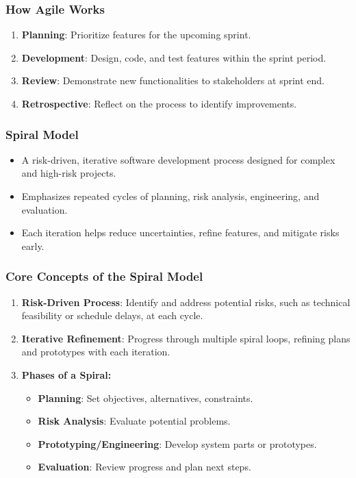 \documentclass{beamer}
\begin{document}
\begin{frame}[fragile]
  \frametitle{How Agile Works}
  \begin{enumerate}
    \item \textbf{Planning}: Prioritize features for the upcoming sprint.
    \item \textbf{Development}: Design, code, and test features within the sprint period.
    \item \textbf{Review}: Demonstrate new functionalities to stakeholders at sprint end.
    \item \textbf{Retrospective}: Reflect on the process to identify improvements.
  \end{enumerate}
\end{frame}

\begin{frame}[fragile]
    \frametitle{Spiral Model}
    \begin{itemize}
        \item A risk-driven, iterative software development process designed for complex and high-risk projects.
        \item Emphasizes repeated cycles of planning, risk analysis, engineering, and evaluation.
        \item Each iteration helps reduce uncertainties, refine features, and mitigate risks early.
    \end{itemize}
\end{frame}

\begin{frame}[fragile]
    \frametitle{Core Concepts of the Spiral Model}
    \begin{enumerate}
        \item \textbf{Risk-Driven Process}: Identify and address potential risks, such as technical feasibility or schedule delays, at each cycle.
        \item \textbf{Iterative Refinement}: Progress through multiple spiral loops, refining plans and prototypes with each iteration.
        \item \textbf{Phases of a Spiral:}
        \begin{itemize}
            \item \textbf{Planning}: Set objectives, alternatives, constraints.
            \item \textbf{Risk Analysis}: Evaluate potential problems.
            \item \textbf{Prototyping/Engineering}: Develop system parts or prototypes.
            \item \textbf{Evaluation}: Review progress and plan next steps.
        \end{itemize}
    \end{enumerate}
\end{frame}
\end{document}
